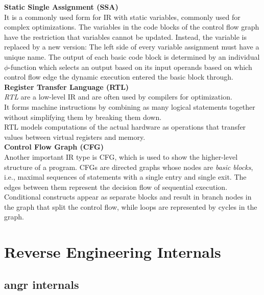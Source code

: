\documentclass[seminar]{plai}
\begin{document}
\noindent\textbf{Static Single Assignment (SSA)}\\
It is a commonly used form for IR with static variables, commonly used for complex optimizations. The variables in the code blocks of the control flow graph have the restriction that variables cannot be updated. Instead, the variable is replaced by a new version:\cite{introduction-to-compilers-and-language-design}
The left side of every variable assignment must have a unique name.
The output of each basic code block is determined by an individual $\phi$-function which selects an output based on its input operands based on which control flow edge the dynamic execution entered the basic block through.\cite{interpreting-programs-in-SSA-form}\\

\noindent\textbf{Register Transfer Language (RTL)}\\
\textit{RTL} are a low-level IR and are often used by compilers for optimization.\\
It forms machine instructions by combining as many logical statements together without simplifying them by breaking them down.\\
RTL models computations of the actual hardware as operations that transfer values between virtual registers and memory.\\

\noindent\textbf{Control Flow Graph (CFG)}\\
Another important IR type is CFG, which is used to show the higher-level structure of a program. CFGs are directed graphs whose nodes are \textit{basic blocks}, i.e., maximal sequences of statements with a single entry and single exit. The edges between them represent the decision flow of sequential execution. Conditional constructs appear as separate blocks and result in branch nodes in the graph that split the control flow, while loops are represented by cycles in the graph.\cite{introduction-to-compilers-and-language-design}
\section{Reverse Engineering Internals}
\label{sec:reverse-engineering-internals}

\subsection{angr internals}
\label{sec:angr-internals}
\end{document}
